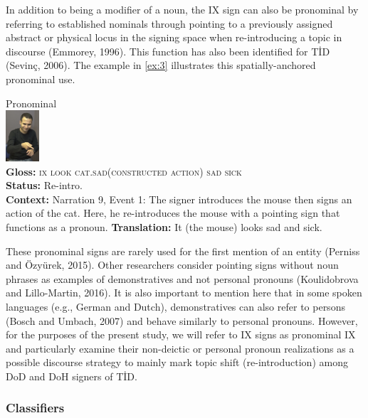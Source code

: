 \documentclass[]{elsarticle} %
\begin{document}
In addition to being a modifier of a noun, the IX sign can also be
pronominal by referring to established nominals through pointing to a
previously assigned abstract or physical locus in the signing space when
re-introducing a topic in discourse (Emmorey, 1996). This function has
also been identified for TİD (Sevinç, 2006). The example in \ref{ex:3}
illustrates this spatially-anchored pronominal use.

\ea 
\ea \label{ex:3} Pronominal \\\glll
{} \includegraphics[width=35pt]{pictures/p5.png} {} {} {} {} \\ \textbf{Gloss:} \textsc{ix} \textsc{look} \textsc{cat.sad(constructed action)} \textsc{sad} \textsc{sick} \\ 
\textbf{Status:} Re-intro. \\
\glt \textbf{Context:} Narration 9, Event 1: The signer introduces the mouse then signs an action of the cat. Here, he re-introduces the mouse with a pointing sign that functions as a pronoun.
\glt \textbf{Translation:} It (the mouse) looks sad and sick.
\z \z

These pronominal signs are rarely used for the first mention of an
entity (Perniss and Özyürek, 2015). Other researchers consider pointing
signs without noun phrases as examples of demonstratives and not
personal pronouns (Koulidobrova and Lillo-Martin, 2016). It is also
important to mention here that in some spoken languages (e.g., German
and Dutch), demonstratives can also refer to persons (Bosch and Umbach,
2007) and behave similarly to personal pronouns. However, for the
purposes of the present study, we will refer to IX signs as pronominal
IX and particularly examine their non-deictic or personal pronoun
realizations as a possible discourse strategy to mainly mark topic shift
(re-introduction) among DoD and DoH signers of TİD.

\hypertarget{classifiers}{%
\subsubsection{Classifiers}\label{classifiers}}
\end{document}
